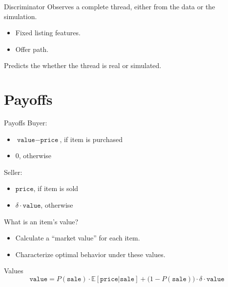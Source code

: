 \documentclass{beamer}
\begin{document}
\begin{frame}{Discriminator}
	Observes a complete thread, either from the data or the simulation.
	\begin{itemize}
		\item Fixed listing features.
		\item Offer path.
	\end{itemize}
	\vspace{5mm}
	Predicts the whether the thread is real or simulated.
\end{frame}

\begin{frame}{Discriminator performance}
	\begin{figure}
		\centering
		\texttt{[image: \\detokenize\{training/simple\_roc.png]}}
	\end{figure}
	AUC: 53.5\%
\end{frame}

\section{Payoffs}

\begin{frame}{Payoffs}
	Buyer:
	\begin{itemize}
		\item $\texttt{value} - \texttt{price}$, if item is purchased
		\item 0, otherwise
	\end{itemize}
	\vspace{5mm}
	Seller:
	\begin{itemize}
		\item $\texttt{price}$, if item is sold
		\item $\delta \cdot \texttt{value}$, otherwise
	\end{itemize}
	\vspace{5mm}
	What is an item's value?
	\begin{itemize}
		\item Calculate a ``market value'' for each item.
		\item Characterize optimal behavior under these values.
	\end{itemize}
\end{frame}

\begin{frame}{Values}
	$$\texttt{value} = P(\texttt{sale}) \cdot \mathbb{E}[\texttt{price} | \texttt{sale}] + \big(1 - P(\texttt{sale})\big) \cdot \delta \cdot \texttt{value}$$
\end{frame}
\end{document}
